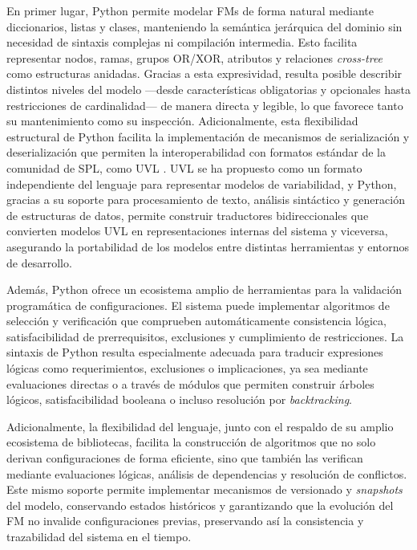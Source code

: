 En primer lugar, Python permite modelar \ac{FM}s de forma natural mediante diccionarios, 
listas y clases, manteniendo la semántica jerárquica del dominio sin necesidad de 
sintaxis complejas ni compilación intermedia. Esto facilita representar nodos, ramas, 
grupos OR/XOR, atributos y relaciones \textit{cross-tree} como estructuras anidadas. Gracias a 
esta expresividad, resulta posible describir distintos niveles del modelo —desde 
características obligatorias y opcionales hasta restricciones de cardinalidad— de manera 
directa y legible, lo que favorece tanto su mantenimiento como su inspección.
Adicionalmente, esta flexibilidad estructural de Python facilita la implementación de mecanismos de 
serialización y deserialización que permiten la interoperabilidad con formatos estándar de la 
comunidad de \ac{SPL}, como \ac{UVL} \citep{sundermann2021uvl}. \ac{UVL} se ha propuesto como un formato independiente del lenguaje para 
representar modelos de variabilidad, y Python, gracias a su soporte para procesamiento de texto, 
análisis sintáctico y generación de estructuras de datos, permite construir traductores bidireccionales que 
convierten modelos \ac{UVL} en representaciones internas del sistema y viceversa, asegurando la portabilidad 
de los modelos entre distintas herramientas y entornos de desarrollo.

Además, Python ofrece un ecosistema amplio de herramientas para la validación 
programática de configuraciones. El sistema puede implementar algoritmos de selección y 
verificación que comprueben automáticamente consistencia lógica, satisfacibilidad de 
prerrequisitos, exclusiones y cumplimiento de restricciones. La sintaxis de Python resulta 
especialmente adecuada para traducir expresiones lógicas como requerimientos, exclusiones o 
implicaciones, ya sea mediante evaluaciones directas o a través de módulos que permiten 
construir árboles lógicos, satisfacibilidad booleana o incluso resolución por \textit{backtracking}.

Adicionalmente, la flexibilidad del lenguaje, junto con el respaldo de su 
amplio ecosistema de bibliotecas, facilita la construcción de algoritmos que no solo 
derivan configuraciones de forma eficiente, sino que también las verifican mediante 
evaluaciones lógicas, análisis de dependencias y resolución de conflictos. Este mismo 
soporte permite implementar mecanismos de versionado y \textit{snapshots} del modelo, conservando 
estados históricos y garantizando que la evolución del \ac{FM} no invalide configuraciones 
previas, preservando así la consistencia y trazabilidad del sistema en el tiempo.

